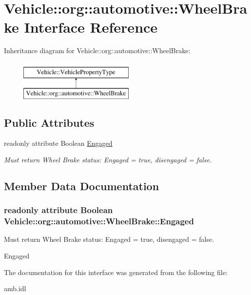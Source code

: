 \hypertarget{interfaceVehicle_1_1org_1_1automotive_1_1WheelBrake}{\section{Vehicle\-:\-:org\-:\-:automotive\-:\-:Wheel\-Brake Interface Reference}
\label{interfaceVehicle_1_1org_1_1automotive_1_1WheelBrake}
}
Inheritance diagram for Vehicle\-:\-:org\-:\-:automotive\-:\-:Wheel\-Brake\-:\begin{figure}[H]
\begin{center}
\leavevmode
\includegraphics[height=2.000000cm]{interfaceVehicle_1_1org_1_1automotive_1_1WheelBrake}
\end{center}
\end{figure}
\subsection*{Public Attributes}
\begin{DoxyCompactItemize}
\item 
readonly attribute Boolean \hyperlink{interfaceVehicle_1_1org_1_1automotive_1_1WheelBrake_ac3997f0e1ac7f68ec41c59b28c7aa0e5}{Engaged}
\begin{DoxyCompactList}\small\item\em Must return Wheel Brake status\-: Engaged = true, disengaged = false. \end{DoxyCompactList}\end{DoxyCompactItemize}


\subsection{Member Data Documentation}
\hypertarget{interfaceVehicle_1_1org_1_1automotive_1_1WheelBrake_ac3997f0e1ac7f68ec41c59b28c7aa0e5}{
\subsubsection[{Engaged}]{\setlength{\rightskip}{0pt plus 5cm}readonly attribute Boolean Vehicle\-::org\-::automotive\-::\-Wheel\-Brake\-::\-Engaged}}\label{interfaceVehicle_1_1org_1_1automotive_1_1WheelBrake_ac3997f0e1ac7f68ec41c59b28c7aa0e5}


Must return Wheel Brake status\-: Engaged = true, disengaged = false. 

Engaged 

The documentation for this interface was generated from the following file\-:\begin{DoxyCompactItemize}
\item 
amb.\-idl\end{DoxyCompactItemize}
